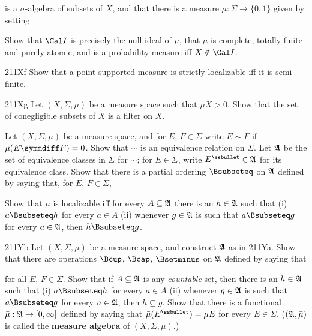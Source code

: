 {\noindent is a $\sigma$-algebra of subsets of $X$, and that there is a
measure $\mu:\Sigma\to\{0,1\}$ given by setting
     
     
\noindent Show that $\Cal I$ is precisely the null ideal of $\mu$, that $\mu$ is complete, totally finite and purely atomic, and is a
probability measure iff $X\notin\Cal I$.
     
\spheader 211Xf Show that a point-supported measure is strictly localizable
iff it is semi-finite.
     
\spheader 211Xg Let $(X,\Sigma,\mu)$ be a measure space such that 
$\mu X>0$.    Show that the set of conegligible subsets of $X$ is a filter
on $X$.

Let $(X,\Sigma,\mu)$ be a measure space, and for
$E$, $F\in\Sigma$ write $E\sim F$ if $\mu(E\symmdiff F)=0$.   Show that
$\sim$ is an equivalence relation on $\Sigma$.   Let $\frak A$ be the
set of equivalence classes in $\Sigma$ for $\sim$;  for $E\in\Sigma$,
write $E^{\ssbullet}\in\frak A$ for its equivalence class.   Show that
there is a partial ordering $\Bsubseteq$ on $\frak A$ defined by saying
that, for $E$, $F\in\Sigma$,
     
     
\noindent Show that $\mu$ is localizable iff for every
$A\subseteq\frak A$ there is an $h\in\frak A$ such that (i)
$a\Bsubseteq h$ for every
$a\in A$ (ii) whenever $g\in\frak A$ is such that $a\Bsubseteq g$ for
every $a\in\frak A$, then $h\Bsubseteq g$.
     
\spheader 211Yb Let $(X,\Sigma,\mu)$ be a measure space, and
construct $\frak A$ as in 211Ya.   Show that there are operations
$\Bcup$, $\Bcap$, $\Bsetminus$ on $\frak A$ defined by saying that
     
     
\noindent for all $E$, $F\in\Sigma$.
Show that if $A\subseteq\frak A$ is any {\it countable} set, then there
is an $h\in\frak A$ such that (i) $a\Bsubseteq h$ for every
$a\in A$ (ii) whenever $g\in\frak A$ is such that $a\Bsubseteq g$ for
every $a\in\frak A$, then $h\subseteq g$.   Show that there is a
functional $\bar\mu:\frak A\to[0,\infty]$ defined by saying that
$\bar\mu(E^{\ssbullet})=\mu E$ for every $E\in\Sigma$.
($(\frak A,\bar\mu)$ is called the {\bf measure algebra} of
$(X,\Sigma,\mu)$.)
     
}
